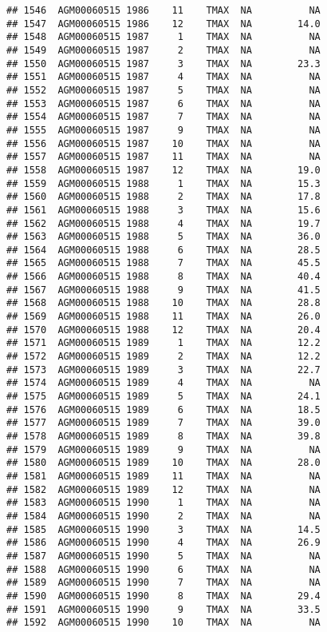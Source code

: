 \documentclass{article}\usepackage[]{graphicx}\usepackage[]{color}
\makeatletter
\newenvironment{kframe}{%
 \def\at@end@of@kframe{}%
 \ifinner\ifhmode%
  \def\at@end@of@kframe{\end{minipage}}%
  \begin{minipage}{\columnwidth}%
 \fi\fi%
 \def\FrameCommand##1{\hskip\@totalleftmargin \hskip-\fboxsep
 \colorbox{shadecolor}{##1}\hskip-\fboxsep
     \hskip-\linewidth \hskip-\@totalleftmargin \hskip\columnwidth}%
 \MakeFramed {\advance\hsize-\width
   \@totalleftmargin\z@ \linewidth\hsize
   \@setminipage}}%
 {\par\unskip\endMakeFramed%
 \at@end@of@kframe}
\newenvironment{knitrout}{}{} %
\makeatother
\begin{document}
\begin{knitrout}
\begin{kframe}
\begin{verbatim}
## 1546  AGM00060515 1986    11    TMAX  NA          NA
## 1547  AGM00060515 1986    12    TMAX  NA        14.0
## 1548  AGM00060515 1987     1    TMAX  NA          NA
## 1549  AGM00060515 1987     2    TMAX  NA          NA
## 1550  AGM00060515 1987     3    TMAX  NA        23.3
## 1551  AGM00060515 1987     4    TMAX  NA          NA
## 1552  AGM00060515 1987     5    TMAX  NA          NA
## 1553  AGM00060515 1987     6    TMAX  NA          NA
## 1554  AGM00060515 1987     7    TMAX  NA          NA
## 1555  AGM00060515 1987     9    TMAX  NA          NA
## 1556  AGM00060515 1987    10    TMAX  NA          NA
## 1557  AGM00060515 1987    11    TMAX  NA          NA
## 1558  AGM00060515 1987    12    TMAX  NA        19.0
## 1559  AGM00060515 1988     1    TMAX  NA        15.3
## 1560  AGM00060515 1988     2    TMAX  NA        17.8
## 1561  AGM00060515 1988     3    TMAX  NA        15.6
## 1562  AGM00060515 1988     4    TMAX  NA        19.7
## 1563  AGM00060515 1988     5    TMAX  NA        36.0
## 1564  AGM00060515 1988     6    TMAX  NA        28.5
## 1565  AGM00060515 1988     7    TMAX  NA        45.5
## 1566  AGM00060515 1988     8    TMAX  NA        40.4
## 1567  AGM00060515 1988     9    TMAX  NA        41.5
## 1568  AGM00060515 1988    10    TMAX  NA        28.8
## 1569  AGM00060515 1988    11    TMAX  NA        26.0
## 1570  AGM00060515 1988    12    TMAX  NA        20.4
## 1571  AGM00060515 1989     1    TMAX  NA        12.2
## 1572  AGM00060515 1989     2    TMAX  NA        12.2
## 1573  AGM00060515 1989     3    TMAX  NA        22.7
## 1574  AGM00060515 1989     4    TMAX  NA          NA
## 1575  AGM00060515 1989     5    TMAX  NA        24.1
## 1576  AGM00060515 1989     6    TMAX  NA        18.5
## 1577  AGM00060515 1989     7    TMAX  NA        39.0
## 1578  AGM00060515 1989     8    TMAX  NA        39.8
## 1579  AGM00060515 1989     9    TMAX  NA          NA
## 1580  AGM00060515 1989    10    TMAX  NA        28.0
## 1581  AGM00060515 1989    11    TMAX  NA          NA
## 1582  AGM00060515 1989    12    TMAX  NA          NA
## 1583  AGM00060515 1990     1    TMAX  NA          NA
## 1584  AGM00060515 1990     2    TMAX  NA          NA
## 1585  AGM00060515 1990     3    TMAX  NA        14.5
## 1586  AGM00060515 1990     4    TMAX  NA        26.9
## 1587  AGM00060515 1990     5    TMAX  NA          NA
## 1588  AGM00060515 1990     6    TMAX  NA          NA
## 1589  AGM00060515 1990     7    TMAX  NA          NA
## 1590  AGM00060515 1990     8    TMAX  NA        29.4
## 1591  AGM00060515 1990     9    TMAX  NA        33.5
## 1592  AGM00060515 1990    10    TMAX  NA          NA

\end{verbatim}
\end{kframe}
\end{knitrout}
\end{document}
